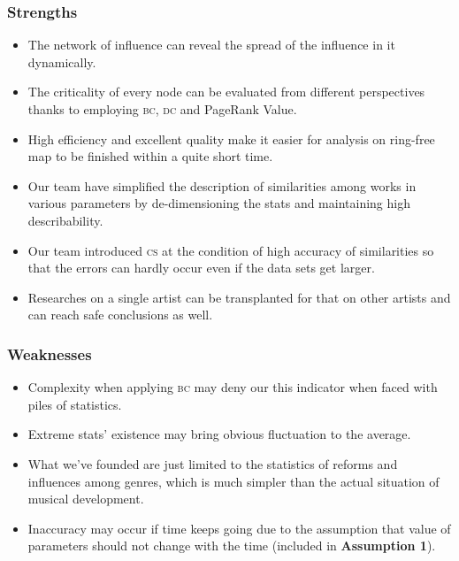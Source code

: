 \documentclass[12pt]{article}
\begin{document}
{\subsubsection{Strengths}
\begin{itemize}
\item The network of influence can reveal the spread of the influence in it dynamically.
\item The criticality of every node can be evaluated from different perspectives thanks to employing \textsc{bc, dc} and PageRank Value.
\item High efficiency and excellent quality make it easier for analysis on ring-free map to be finished within a quite short time.
\item Our team have simplified the description of similarities among works in various parameters by de-dimensioning the stats and maintaining high describability.
\item Our team introduced {\textsc{cs}} at the condition of high accuracy of similarities so that the errors can hardly occur even if the data sets get larger.
\item Researches on a single artist can be transplanted for that on other artists and can reach safe conclusions as well.
\end{itemize}

\subsubsection{Weaknesses}
\begin{itemize}
	\item Complexity when applying \textsc{bc} may deny our this indicator when faced with piles of statistics.
	\item Extreme stats' existence may bring obvious fluctuation to the average.
	\item What we've founded are just limited to the statistics of reforms and influences among genres, which is much simpler than the actual situation of musical development.
	\item Inaccuracy may occur if time keeps going due to the assumption that value of parameters should not change with the time (included in \textbf{Assumption 1}).
\end{itemize}
\clearpage
}
\end{document}
